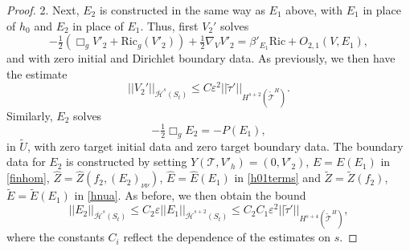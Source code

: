 \documentclass[10pt]{amsart}
\renewcommand{\b}{\beta}
\newcommand{\e}{\varepsilon}
\newcommand{\cT}{{\mathcal T}}
\newcommand{\cH}{{\mathcal H}}
\newcommand{\Ric}{\mathrm{Ric}}
\renewcommand{\hat}{\widehat}
\newcommand{\<}{\langle}
\renewcommand{\>}{\rangle}
\newcommand{\w}{\widetilde}
\theoremstyle{plain}
\theoremstyle{remark}
\theoremstyle{definition}
\numberwithin{equation}{section}
\begin{document}
\begin{proof}
2. Next, $E_2$ is constructed in the same way as $E_1$ above, with $E_1$ in place of $h_0$ and $E_2$ in place of 
$E_1$. Thus, first $V_2'$ solves 
$$-\tfrac{1}{2}(\Box_g V'_2+ \Ric_g (V'_2)) + \tfrac{1}{2}\nabla_{V} V'_2 = \b'_{E_1} \Ric + O_{2,1}(V,E_1),$$
and with zero initial and Dirichlet boundary data. As previously, we then have the estimate 
$$||V_2'||_{\bar \cH^s(S_t)} \leq C\e^2  ||\w \tau'||_{H^{s+2}(\w \cT^H)}.$$
Similarly, $E_2$ solves 
$$-\tfrac{1}{2}\Box_g E_2  = -P(E_1),$$
in $\w U$, with zero target  initial data and zero target boundary data. The boundary data for $E_2$ is constructed by 
setting $Y(\cT, V'_h) = (0, V'_2)$, $E = E(E_1)$ in \eqref{finhom}, $\hat Z = \hat Z(f_2, (E_2)_{\nu \nu})$, $\hat E = \hat E(E_1)$ in \eqref{h01terms} and 
$\w Z = \w Z(f_2)$, $\w E = \w E(E_1)$ in \eqref{hnua}.  As before, we then obtain the bound 
$$||E_2||_{\bar \cH^s(S_t)} \leq C_2\e ||E_1||_{\bar \cH^{s+2}(S_t)} \leq C_2 C_1\e^2||\w \tau'||_{H^{s+4}(\w \cT^H)},$$
where the constants $C_i$ reflect the dependence of the estimates on $s$. 


\end{proof}
\end{document}
